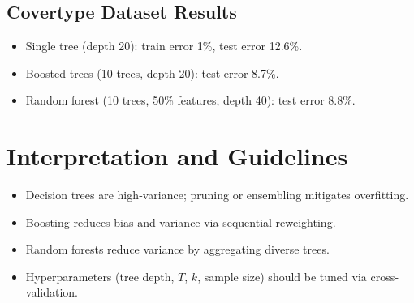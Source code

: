 \documentclass[11pt]{article}
\begin{document}
\subsection{Covertype Dataset Results}
\begin{itemize}
  \item Single tree (depth 20): train error 1\%, test error 12.6\%.
  \item Boosted trees (10 trees, depth 20): test error 8.7\%.
  \item Random forest (10 trees, 50\% features, depth 40): test error 8.8\%.
\end{itemize}

\section{Interpretation and Guidelines}
\begin{itemize}
  \item Decision trees are high‐variance; pruning or ensembling mitigates overfitting.
  \item Boosting reduces bias and variance via sequential reweighting.
  \item Random forests reduce variance by aggregating diverse trees.
  \item Hyperparameters (tree depth, $T$, $k$, sample size) should be tuned via cross‐validation.
\end{itemize}
\end{document}
